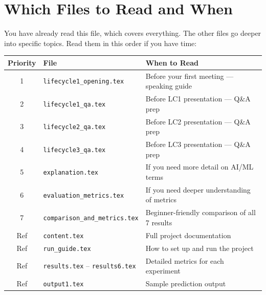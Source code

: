 \documentclass[11pt]{article}
\begin{document}
\section{Which Files to Read and When}

You have already read this file, which covers everything. The other files go deeper into specific topics. Read them in this order if you have time:

\begin{table}[H]
    \centering
    \renewcommand{\arraystretch}{1.3}
    \begin{tabular}{clp{7cm}}
        \toprule
        \textbf{Priority} & \textbf{File} & \textbf{When to Read} \\
        \midrule
        1 & \texttt{lifecycle1\_opening.tex} & Before your first meeting --- speaking guide \\
        2 & \texttt{lifecycle1\_qa.tex} & Before LC1 presentation --- Q\&A prep \\
        3 & \texttt{lifecycle2\_qa.tex} & Before LC2 presentation --- Q\&A prep \\
        4 & \texttt{lifecycle3\_qa.tex} & Before LC3 presentation --- Q\&A prep \\
        5 & \texttt{explanation.tex} & If you need more detail on AI/ML terms \\
        6 & \texttt{evaluation\_metrics.tex} & If you need deeper understanding of metrics \\
        7 & \texttt{comparison\_and\_metrics.tex} & Beginner-friendly comparison of all 7 results \\
        \midrule
        Ref & \texttt{content.tex} & Full project documentation \\
        Ref & \texttt{run\_guide.tex} & How to set up and run the project \\
        Ref & \texttt{results.tex} -- \texttt{results6.tex} & Detailed metrics for each experiment \\
        Ref & \texttt{output1.tex} & Sample prediction output \\
        \bottomrule
    \end{tabular}
\end{table}
\end{document}
